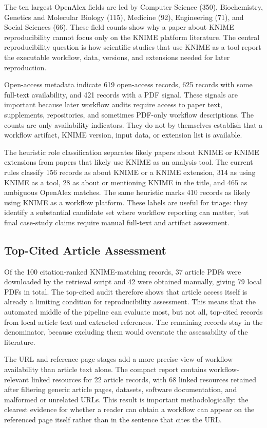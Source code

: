 \documentclass[runningheads]{llncs}
\begin{document}
The ten largest OpenAlex fields are led by Computer Science (350),
Biochemistry, Genetics and Molecular Biology (115), Medicine (92),
Engineering (71), and Social Sciences (66). These field counts show why a
paper about KNIME reproducibility cannot focus only on the KNIME platform
literature. The central reproducibility question is how scientific studies
that use KNIME as a tool report the executable workflow, data, versions, and
extensions needed for later reproduction.

Open-access metadata indicate 619 open-access records, 625 records with some
full-text availability, and 421 records with a PDF signal. These signals are
important because later workflow audits require access to paper text,
supplements, repositories, and sometimes PDF-only workflow descriptions. The
counts are only availability indicators. They do not by themselves establish
that a workflow artifact, KNIME version, input data, or extension list is
available.

The heuristic role classification separates likely papers about KNIME or KNIME
extensions from papers that likely use KNIME as an analysis tool. The current
rules classify 156 records as about KNIME or a KNIME extension, 314 as using
KNIME as a tool, 28 as about or mentioning KNIME in the title, and 465 as
ambiguous OpenAlex matches. The same heuristic marks 410 records as likely
using KNIME as a workflow platform. These labels are useful for triage: they
identify a substantial candidate set where workflow reporting can matter, but
final case-study claims require manual full-text and artifact assessment.

\subsection{Top-Cited Article Assessment}

Of the 100 citation-ranked KNIME-matching records, 37 article PDFs were
downloaded by the retrieval script and 42 were obtained manually, giving 79
local PDFs in total. The top-cited audit therefore shows that article access
itself is already a limiting condition for reproducibility assessment. This
means that the automated middle of the pipeline can evaluate most,
but not all, top-cited records from local article text and extracted
references. The remaining records stay in the denominator, because excluding
them would overstate the assessability of the literature.

The URL and reference-page stages add a more precise view of workflow
availability than article text alone. The compact report contains
workflow-relevant linked resources for 22 article records, with 68 linked
resources retained after filtering generic article pages, datasets, software
documentation, and malformed or unrelated URLs. This result is important
methodologically: the clearest evidence for whether a reader can obtain a
workflow can appear on the referenced page itself rather than in the sentence
that cites the URL.
\end{document}

